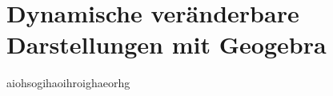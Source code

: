 
\setcounter{H-section}{4}
\renewcommand*\thesection{H\Nummerierung{\arabic{H-section}}}
\section{Dynamische veränderbare Darstellungen mit Geogebra}


aiohsogihaoihroighaeorhg